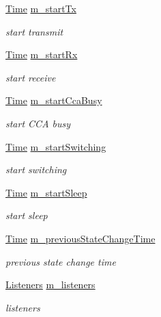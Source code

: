 \begin{DoxyCompactItemize}
\hyperlink{classns3_1_1Time}{Time} \hyperlink{classns3_1_1WifiPhyStateHelper_a9bb8ffc27c3a896f33681f8c1a17cf19}{m\+\_\+start\+Tx}
\begin{DoxyCompactList}\small\item\em start transmit \end{DoxyCompactList}\item 
\hyperlink{classns3_1_1Time}{Time} \hyperlink{classns3_1_1WifiPhyStateHelper_a2f079a764e6dbb5c51e66d588d06a876}{m\+\_\+start\+Rx}
\begin{DoxyCompactList}\small\item\em start receive \end{DoxyCompactList}\item 
\hyperlink{classns3_1_1Time}{Time} \hyperlink{classns3_1_1WifiPhyStateHelper_ac1fbac45353b977a8c2637e2ba474c1b}{m\+\_\+start\+Cca\+Busy}
\begin{DoxyCompactList}\small\item\em start C\+CA busy \end{DoxyCompactList}\item 
\hyperlink{classns3_1_1Time}{Time} \hyperlink{classns3_1_1WifiPhyStateHelper_a73e8ea451a5ec7d936eea34e92449e26}{m\+\_\+start\+Switching}
\begin{DoxyCompactList}\small\item\em start switching \end{DoxyCompactList}\item 
\hyperlink{classns3_1_1Time}{Time} \hyperlink{classns3_1_1WifiPhyStateHelper_a2227bb3287a1f347523d17e09a453f5b}{m\+\_\+start\+Sleep}
\begin{DoxyCompactList}\small\item\em start sleep \end{DoxyCompactList}\item 
\hyperlink{classns3_1_1Time}{Time} \hyperlink{classns3_1_1WifiPhyStateHelper_a47109acae389d313ca5121bf4b0a8f94}{m\+\_\+previous\+State\+Change\+Time}
\begin{DoxyCompactList}\small\item\em previous state change time \end{DoxyCompactList}\item 
\hyperlink{classns3_1_1WifiPhyStateHelper_a76aeb492718646f940e216a63ff167f1}{Listeners} \hyperlink{classns3_1_1WifiPhyStateHelper_ac698c0587805ecffc383f70bcd0c28d5}{m\+\_\+listeners}
\begin{DoxyCompactList}\small\item\em listeners \end{DoxyCompactList}\item 

\end{DoxyCompactItemize}
